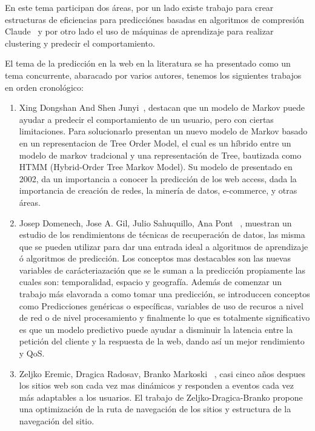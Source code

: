\documentclass{udparticle}
\begin{document}
En este tema participan dos áreas, por un lado existe trabajo para crear estructuras de eficiencias para predicciónes basadas en algoritmos de compresión Claude~\cite{BWT} y por otro lado el uso de máquinas de aprendizaje para realizar clustering y predecir el comportamiento.

El tema de la predicción en la web en la literatura se ha presentado como un tema concurrente, abaracado por varios autores, tenemos los siguientes trabajos en orden cronológico:


\begin{enumerate}

  \item Xing Dongshan And Shen Junyi~\cite{tmmd}, destacan que un modelo de Markov puede ayudar a predecir el comportamiento de un usuario, pero con ciertas limitaciones.
  Para solucionarlo presentan un nuevo modelo de Markov basado en un representacion de Tree Order Model, el cual es un híbrido entre un modelo de markov tradcional y una representación de Tree, bautizada como HTMM (Hybrid-Order Tree Markov Model). 
  Su modelo de presentado en 2002, da un importancia a conocer la predicción de los web access, dada la importancia de creación de redes, la minería de datos, e-commerce, y otras áreas.  


  \item Josep Domenech, Jose A. Gil, Julio Sahuquillo, Ana Pont ~\cite{domenech}, muestran un estudio de los rendimientons de técnicas de recuperación de datos, las misma que se pueden utilizar para dar una entrada ideal a algoritmos de aprendizaje ó algoritmos de predicción. Los conceptos mas destacables son las nuevas variables de carácteriazación que se le suman a la predicción propiamente las cuales son: temporalidad, espacio y  geografía. 
  Además de comenzar un trabajo más elavorada a como tomar una predicción, se introduccen conceptos como Predicciones genéricas o específicas, variables de uso de recuros a nivel de red o de nivel procesamiento y finalmente lo que es totalmente significativo es que un modelo predictivo puede ayudar a disminuir la latencia entre la petición del cliente y la respuesta de la web, dando así un mejor rendimiento y QoS.


  \item Zeljko Eremic, Dragica Radosav, Branko Markoski ~\cite{Dragica}, casi cinco años despues los sitios web son cada vez mas dinámicos y responden a eventos cada vez más adaptables a los usuarios. El trabajo de Zeljko-Dragica-Branko propone una optimización de la ruta de navegación de los sitios y estructura de la navegación del sitio. 



\end{enumerate}
\end{document}
